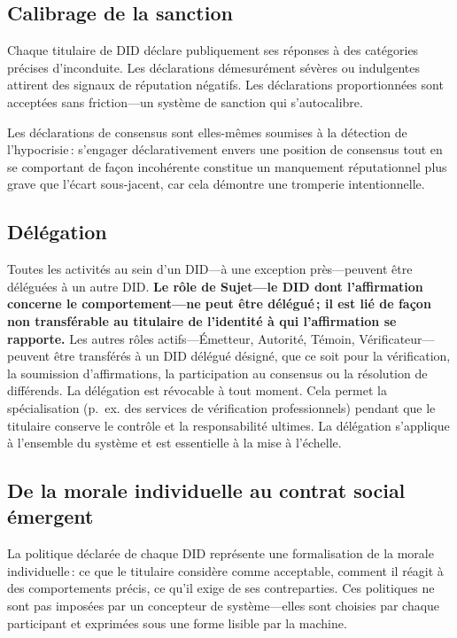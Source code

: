 \documentclass[11pt,a4paper,twocolumn]{article}
\begin{document}
\subsection{Calibrage de la sanction}

Chaque titulaire de DID déclare publiquement ses réponses à des catégories précises d'inconduite. Les déclarations démesurément sévères ou indulgentes attirent des signaux de réputation négatifs. Les déclarations proportionnées sont acceptées sans friction---un système de sanction qui s'autocalibre.

Les déclarations de consensus sont elles-mêmes soumises à la détection de l'hypocrisie\,: s'engager déclarativement envers une position de consensus tout en se comportant de façon incohérente constitue un manquement réputationnel plus grave que l'écart sous-jacent, car cela démontre une tromperie intentionnelle.

\subsection{Délégation}

Toutes les activités au sein d'un DID---à une exception près---peuvent être déléguées à un autre DID. \textbf{Le rôle de Sujet---le DID dont l'affirmation concerne le comportement---ne peut être délégué\,; il est lié de façon non transférable au titulaire de l'identité à qui l'affirmation se rapporte.} Les autres rôles actifs---Émetteur, Autorité, Témoin, Vérificateur---peuvent être transférés à un DID délégué désigné, que ce soit pour la vérification, la soumission d'affirmations, la participation au consensus ou la résolution de différends. La délégation est révocable à tout moment. Cela permet la spécialisation (p.~ex. des services de vérification professionnels) pendant que le titulaire conserve le contrôle et la responsabilité ultimes. La délégation s'applique à l'ensemble du système et est essentielle à la mise à l'échelle.

\subsection{De la morale individuelle au contrat social émergent}

La politique déclarée de chaque DID représente une formalisation de la morale individuelle\,: ce que le titulaire considère comme acceptable, comment il réagit à des comportements précis, ce qu'il exige de ses contreparties. Ces politiques ne sont pas imposées par un concepteur de système---elles sont choisies par chaque participant et exprimées sous une forme lisible par la machine.
\end{document}
